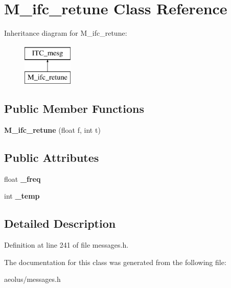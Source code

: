 \hypertarget{class_m__ifc__retune}{}\section{M\+\_\+ifc\+\_\+retune Class Reference}
\label{class_m__ifc__retune}
Inheritance diagram for M\+\_\+ifc\+\_\+retune\+:\begin{figure}[H]
\begin{center}
\leavevmode
\includegraphics[height=2.000000cm]{class_m__ifc__retune}
\end{center}
\end{figure}
\subsection*{Public Member Functions}
\begin{DoxyCompactItemize}
\item 
\mbox{\label{class_m__ifc__retune_a706897571aa8c9bb0ba8a4984a6376da}} 
{\bfseries M\+\_\+ifc\+\_\+retune} (float f, int t)
\end{DoxyCompactItemize}
\subsection*{Public Attributes}
\begin{DoxyCompactItemize}
\item 
\mbox{\label{class_m__ifc__retune_aae9159886b1497636eb5ef1aee6f6c25}} 
float {\bfseries \+\_\+freq}
\item 
\mbox{\label{class_m__ifc__retune_aa314eaaec6fabfc4938387c42b886907}} 
int {\bfseries \+\_\+temp}
\end{DoxyCompactItemize}


\subsection{Detailed Description}


Definition at line 241 of file messages.\+h.



The documentation for this class was generated from the following file\+:\begin{DoxyCompactItemize}
\item 
aeolus/messages.\+h\end{DoxyCompactItemize}
